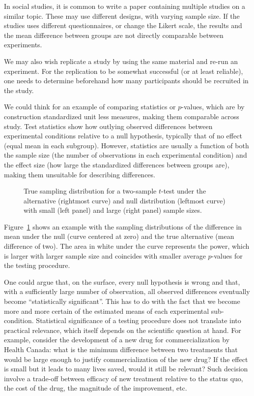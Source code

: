 \documentclass[
  11pt,
  letterpaper,
]{scrbook}
\theoremstyle{definition}
\theoremstyle{definition}
\theoremstyle{remark}
\begin{document}
In social studies, it is common to write a paper containing multiple
studies on a similar topic. These may use different designs, with
varying sample size. If the studies uses different questionnaires, or
change the Likert scale, the results and the mean difference between
groups are not directly comparable between experiments.

We may also wish replicate a study by using the same material and re-run
an experiment. For the replication to be somewhat successful (or at
least reliable), one needs to determine beforehand how many participants
should be recruited in the study.

We could think for an example of comparing statistics or \(p\)-values,
which are by construction standardized unit less measures, making them
comparable across study. Test statistics show how outlying observed
differences between experimental conditions relative to a null
hypothesis, typically that of no effect (equal mean in each subgroup).
However, statistics are usually a function of both the sample size (the
number of observations in each experimental condition) and the effect
size (how large the standardized differences between groups are), making
them unsuitable for describing differences.

\begin{figure}[ht!]


\caption{\label{fig-effectsize}True sampling distribution for a
two-sample \(t\)-test under the alternative (rightmost curve) and null
distribution (leftmost curve) with small (left panel) and large (right
panel) sample sizes.}

\end{figure}%

Figure~\ref{fig-effectsize} shows an example with the sampling
distributions of the difference in mean under the null (curve centered
at zero) and the true alternative (mean difference of two). The area in
white under the curve represents the power, which is larger with larger
sample size and coincides with smaller average \(p\)-values for the
testing procedure.

One could argue that, on the surface, every null hypothesis is wrong and
that, with a sufficiently large number of observation, all observed
differences eventually become ``statistically significant''. This has to
do with the fact that we become more and more certain of the estimated
means of each experimental sub-condition. Statistical significance of a
testing procedure does not translate into practical relevance, which
itself depends on the scientific question at hand. For example, consider
the development of a new drug for commercialization by Health Canada:
what is the minimum difference between two treatments that would be
large enough to justify commercialization of the new drug? If the effect
is small but it leads to many lives saved, would it still be relevant?
Such decision involve a trade-off between efficacy of new treatment
relative to the status quo, the cost of the drug, the magnitude of the
improvement, etc.
\end{document}
